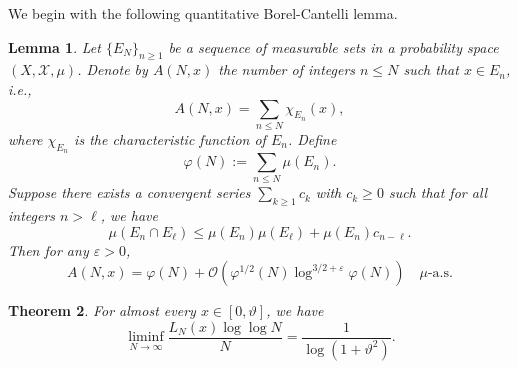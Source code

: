 \documentclass[final,1p,times]{elsarticle}
\newtheorem{theorem}{Theorem}[section]
\newtheorem{lemma}[theorem]{Lemma}
\numberwithin{equation}{section}
\begin{document}
We begin with the following quantitative Borel-Cantelli lemma.

\begin{lemma} \cite{Ph-1967} \label{lema5.1}
Let $\{E_N\}_{n \geq 1}$ be a sequence of measurable sets in a probability space $(X, \mathcal{X}, \mu)$. Denote by $A(N,x)$ the number of integers $n \leq N$ such that $x \in E_n$, i.e., 
\[
A(N,x) = \sum_{n \leq N} \chi_{E_n}(x),
\]
where $\chi_{E_n}$ is the characteristic function of $E_n$. Define
\[
\varphi(N) := \sum_{n \leq N} \mu(E_n).
\]
Suppose there exists a convergent series $\sum_{k \geq 1} c_k$ with $c_k \geq 0$ such that for all integers $n > \ell$, we have 
\begin{equation} \label{5.1}
\mu(E_n \cap E_{\ell}) \leq \mu(E_n) \mu(E_{\ell}) + \mu(E_n) c_{n-\ell}.
\end{equation}
Then for any $\varepsilon > 0$, 
\begin{equation} \label{5.2}
A(N,x) = \varphi(N) + \mathcal{O}\left(\varphi^{1/2}(N) \log^{3/2 + \varepsilon} \varphi(N)\right) \quad \mu\text{-a.s.}
\end{equation}
\end{lemma}

\begin{theorem} \label{th.5.2}
For almost every $x \in [0, \vartheta]$, we have
\[
\liminf_{N \to \infty} \frac{L_N(x) \log \log N}{N} = \frac{1}{\log \left( 1+ \vartheta^2\right)}.
\]
\end{theorem}
\end{document}
